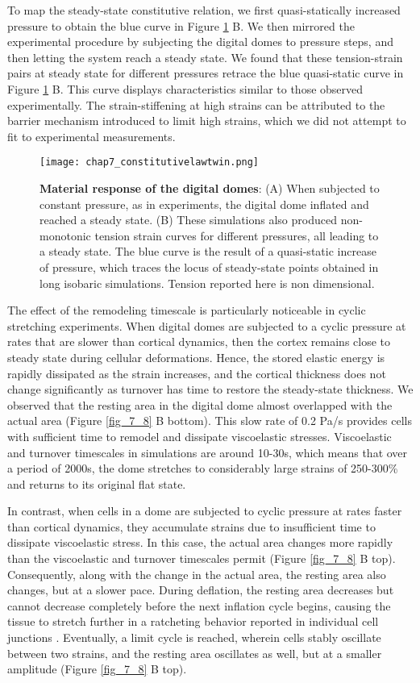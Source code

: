 To map the steady-state constitutive relation, we first quasi-statically increased pressure to obtain the blue curve in Figure \ref{fig_7_7} B. We then  mirrored the experimental procedure by subjecting the digital domes to pressure steps, and then letting the system reach a steady state. We found that these tension-strain pairs at steady state for different pressures retrace the blue quasi-static curve in Figure \ref{fig_7_7} B. This curve displays characteristics similar to those observed experimentally. The strain-stiffening at high strains can be attributed to the barrier mechanism introduced to limit high strains, which we did not attempt to fit to experimental measurements. 


\begin{figure}[t]
	\centering
	\texttt{[image: chap7\_constitutivelawtwin.png]}
	\caption{\label{fig_7_7} \textbf{Material response of the digital domes}: (A) When subjected to constant pressure, as in experiments, the digital dome inflated and reached a steady state. (B) These simulations also produced non-monotonic tension strain curves for different pressures, all leading to a steady state. The blue curve is the result of a quasi-static increase of pressure, which traces the locus of steady-state points obtained in long isobaric simulations. Tension reported here is non dimensional.}
\end{figure}

The effect of the remodeling timescale is particularly noticeable in cyclic stretching experiments. When digital domes are subjected to a cyclic pressure at rates that are slower than cortical dynamics, then the cortex remains close to steady state during cellular deformations. Hence, the stored elastic energy is rapidly dissipated as the strain increases, and the cortical thickness does not change significantly as turnover has time to restore the steady-state thickness. We observed that the resting area in the digital dome almost overlapped with the actual area (Figure \ref{fig_7_8} B bottom). This slow rate of 0.2 Pa/s provides cells with sufficient time to remodel and dissipate viscoelastic stresses. Viscoelastic and turnover timescales in simulations are around 10-30s, which means that over a period of 2000s, the dome stretches to considerably large strains of 250-300\% and returns to its original flat state.

In contrast, when cells in a dome are subjected to cyclic pressure at rates faster than cortical dynamics, they accumulate strains due to insufficient time to dissipate viscoelastic stress. In this case, the actual area changes more rapidly than the viscoelastic and turnover timescales permit (Figure \ref{fig_7_8} B top). Consequently, along with the change in the actual area, the resting area also changes, but at a slower pace. During deflation, the resting area decreases but cannot decrease completely before the next inflation cycle begins, causing the tissue to stretch further in a ratcheting behavior reported in individual cell junctions \cite{clement2017}. Eventually, a limit cycle is reached, wherein cells stably oscillate between two strains, and the resting area oscillates as well, but at a smaller amplitude (Figure \ref{fig_7_8} B top).


